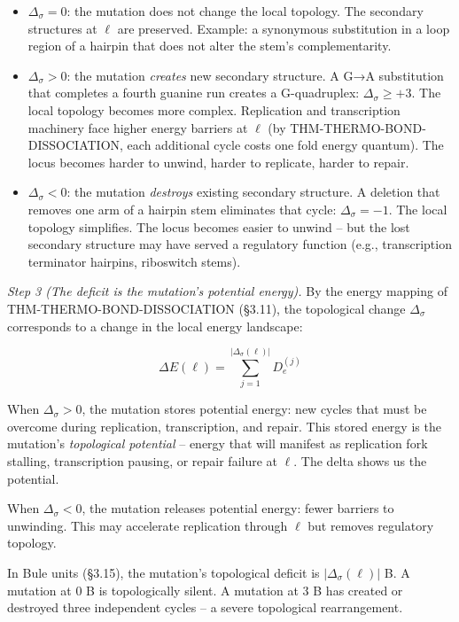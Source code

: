 \documentclass[
  11pt,
]{article}
\begin{document}
\begin{itemize}
\item
  \(\Delta_\sigma = 0\): the mutation does not change the local
  topology. The secondary structures at \(\ell\) are preserved. Example:
  a synonymous substitution in a loop region of a hairpin that does not
  alter the stem's complementarity.
\item
  \(\Delta_\sigma > 0\): the mutation \emph{creates} new secondary
  structure. A G→A substitution that completes a fourth guanine run
  creates a G-quadruplex: \(\Delta_\sigma \geq +3\). The local topology
  becomes more complex. Replication and transcription machinery face
  higher energy barriers at \(\ell\) (by THM-THERMO-BOND-DISSOCIATION,
  each additional cycle costs one fold energy quantum). The locus
  becomes harder to unwind, harder to replicate, harder to repair.
\item
  \(\Delta_\sigma < 0\): the mutation \emph{destroys} existing secondary
  structure. A deletion that removes one arm of a hairpin stem
  eliminates that cycle: \(\Delta_\sigma = -1\). The local topology
  simplifies. The locus becomes easier to unwind -- but the lost
  secondary structure may have served a regulatory function (e.g.,
  transcription terminator hairpins, riboswitch stems).
\end{itemize}

\emph{Step 3 (The deficit is the mutation's potential energy).} By the
energy mapping of THM-THERMO-BOND-DISSOCIATION (§3.11), the topological
change \(\Delta_\sigma\) corresponds to a change in the local energy
landscape:

\[\Delta E(\ell) = \sum_{j=1}^{|\Delta_\sigma(\ell)|} D_e^{(j)}\]

When \(\Delta_\sigma > 0\), the mutation stores potential energy: new
cycles that must be overcome during replication, transcription, and
repair. This stored energy is the mutation's \emph{topological
potential} -- energy that will manifest as replication fork stalling,
transcription pausing, or repair failure at \(\ell\). The delta shows us
the potential.

When \(\Delta_\sigma < 0\), the mutation releases potential energy:
fewer barriers to unwinding. This may accelerate replication through
\(\ell\) but removes regulatory topology.

In Bule units (§3.15), the mutation's topological deficit is
\(|\Delta_\sigma(\ell)|\) B. A mutation at 0 B is topologically silent.
A mutation at 3 B has created or destroyed three independent cycles -- a
severe topological rearrangement.
\end{document}
